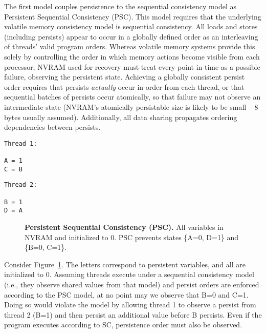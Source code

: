 The first model couples persistence to the sequential consistency model as Persistent Sequential Consistency (PSC).
This model requires that the underlying volatile memory consistency model is sequential consistency.
All loads and stores (including persists) appear to occur in a globally defined order as an interleaving of threads' valid program orders.
Whereas volatile memory systems provide this solely by controlling the order in which memory actions become visible from each processor, NVRAM used for recovery must treat every point in time as a possible failure, observing the persistent state.
Achieving a globally consistent persist order requires that persists \emph{actually} occur in-order from each thread, or that sequential batches of persists occur atomically, so that failure may not observe an intermediate state (NVRAM's atomically persistable size is likely to be small -- 8 bytes usually assumed).
Additionally, all data sharing propagates ordering dependencies between persists.

{
\singlespacing
\newsavebox{\PSCThreadOne}
\begin{lrbox}{\PSCThreadOne}
  \begin{lstlisting}
Thread 1:

A = 1
C = B
  \end{lstlisting}
\end{lrbox}

\newsavebox{\PSCThreadTwo}
\begin{lrbox}{\PSCThreadTwo}
  \begin{lstlisting}
Thread 2:

B = 1
D = A
  \end{lstlisting}
\end{lrbox}

\begin{figure}[]
\centering
\subfigure{ \usebox{\PSCThreadOne} }
\hspace{1 in}
\subfigure{ \usebox{\PSCThreadTwo} }
\caption{\textbf{Persistent Sequential Consistency (PSC).} All variables in NVRAM and initialized to 0.  PSC prevents states \{A=0, D=1\} and \{B=0, C=1\}.}
\label{fig:PSC}
\end{figure}
}

Consider Figure~\ref{fig:PSC}.
The letters correspond to persistent variables, and all are initialized to 0.
Assuming threads execute under a sequential consistency model (i.e., they observe shared values from that model) and persist orders are enforced according to the PSC model, at no point may we observe that B=0 and C=1.
Doing so would violate the model by allowing thread 1 to observe a persist from thread 2 (B=1) and then persist an additional value before B persists.
Even if the program executes according to SC, persistence order must also be observed.

